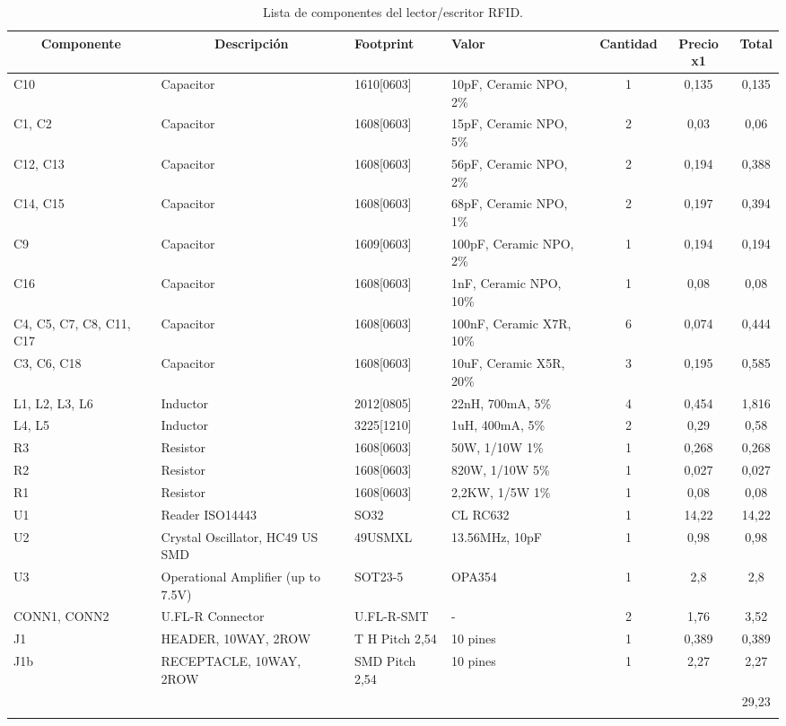 \begin{longtable}{|p{1cm}|p{2.5cm}|p{2cm}|p{2.5cm}|c|c|c|}
\hline
\multicolumn{1}{|c|}{\textbf{Componente}} & \multicolumn{1}{c|}{\textbf{Descripción}} & \textbf{ Footprint} & \textbf{Valor} & \textbf{Cantidad} & \textbf{Precio x1} & \textbf{Total} \\ \hline
C10 & Capacitor & 1610[0603] & 10pF, Ceramic NPO, 2\% & 1 & 0,135 & 0,135 \\ \hline
C1, C2 & Capacitor & 1608[0603] & 15pF, Ceramic NPO, 5\% & 2 & 0,03 & 0,06 \\ \hline
C12, C13 & Capacitor & 1608[0603] & 56pF, Ceramic NPO, 2\% & 2 & 0,194 & 0,388 \\ \hline
C14, C15 & Capacitor & 1608[0603] & 68pF, Ceramic NPO, 1\% & 2 & 0,197 & 0,394 \\ \hline
C9 & Capacitor & 1609[0603] & 100pF, Ceramic NPO,  2\% & 1 & 0,194 & 0,194 \\ \hline
C16 & Capacitor & 1608[0603] & 1nF, Ceramic NPO, 10\% & 1 & 0,08 & 0,08 \\ \hline
C4, C5, C7, C8, C11, C17 & Capacitor & 1608[0603] & 100nF, Ceramic X7R, 10\% & 6 & 0,074 & 0,444 \\ \hline
C3, C6, C18 & Capacitor & 1608[0603] & 10uF, Ceramic X5R, 20\% & 3 & 0,195 & 0,585 \\ \hline
L1, L2, L3, L6 & Inductor & 2012[0805] & 22nH, 700mA, 5\% & 4 & 0,454 & 1,816 \\ \hline
L4, L5 & Inductor & 3225[1210] & 1uH, 400mA, 5\% & 2 & 0,29 & 0,58 \\ \hline
R3 & Resistor & 1608[0603] & 50W, 1/10W   1\% & 1 & 0,268 & 0,268 \\ \hline
R2 & Resistor & 1608[0603] & 820W, 1/10W   5\% & 1 & 0,027 & 0,027 \\ \hline
R1 & Resistor & 1608[0603] & 2,2KW, 1/5W   1\% & 1 & 0,08 & 0,08 \\ \hline
U1 & Reader ISO14443 & SO32 & CL RC632 & 1 & 14,22 & 14,22 \\ \hline
U2 & Crystal Oscillator, HC49 US SMD & 49USMXL & 13.56MHz, 10pF & 1 & 0,98 & 0,98 \\ \hline
U3 & Operational Amplifier (up to 7.5V) & SOT23-5 & OPA354 & 1 & 2,8 & 2,8 \\ \hline
CONN1, CONN2 & U.FL-R Connector & U.FL-R-SMT & - & 2 & 1,76 & 3,52 \\ \hline
J1 & HEADER, 10WAY, 2ROW & T H Pitch 2,54 & 10 pines & 1 & 0,389 & 0,389 \\ \hline
J1b & RECEPTACLE, 10WAY, 2ROW & SMD  Pitch 2,54 & 10 pines & 1 & 2,27 & 2,27 \\ \hline
 &  & \multicolumn{1}{l|}{} & \multicolumn{1}{l|}{} & \multicolumn{1}{l|}{} & \multicolumn{1}{l|}{} & 29,23 \\ \hline
\caption{Lista de componentes del lector/escritor RFID.}
\label{}
\end{longtable}
